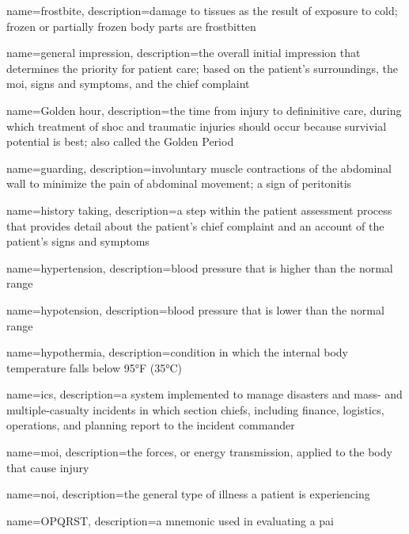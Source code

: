 \documentclass[../../EMT-169.tex]{subfiles}
\begin{document}
	{
		name=frostbite,
		description={damage to tissues as the result of exposure to cold; frozen or partially frozen body parts are frostbitten}
	}
	
	{
		name=general impression,
		description={the overall initial impression that determines the priority for patient care; based on the patient's surroundings, the \acrfull{moi}, signs and symptoms, and the chief complaint}
	}

	{
		name=Golden hour,
		description={the time from injury to defininitive care, during which treatment of shoc and traumatic injuries should occur because survivial potential is best; also called the Golden Period}
	}

	{
		name=guarding,
		description={involuntary muscle contractions of the abdominal wall to minimize the pain of abdominal movement; a sign of peritonitis}
	}

	{
		name=history taking,
		description={a step within the patient assessment process that provides detail about the patient's chief complaint and an account of the patient's signs and symptoms}
	}

	{
		name=hypertension,
		description={blood pressure that is higher than the normal range}
	}

	{
		name=hypotension,
		description={blood pressure that is lower than the normal range}
	}

	{
		name=hypothermia,
		description={condition in which the internal body temperature falls below 95°F (35°C)}
	}
	
	{
		name=\acrlong{ics},
		description={a system implemented to manage disasters and mass- and multiple-casualty incidents in which section chiefs, including finance, logistics, operations, and planning report to the incident commander}
	}
	
	{
		name=\acrfull{moi},
		description={the forces, or energy transmission, applied to the body that cause injury}
	}
	
	{
		name=\acrfull{noi},
		description={the general type of illness a patient is experiencing}
	}
	
	{
		name=\acrfull{OPQRST},
		description={a mnemonic used in evaluating a pai}
	}	
\end{document}
